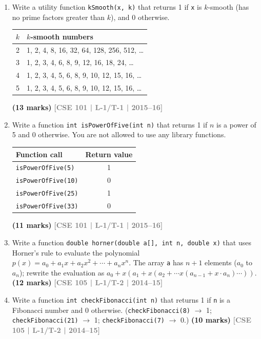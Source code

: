 \documentclass[12pt,a3paper]{article}
\newcommand{\yr}[1]{\hfill\textcolor{gray}{\small\textbf{[#1]}}}
\newcommand{\mk}[1]{\textcolor{orange!70!black}{\small\textbf{(#1 marks)}}}
\begin{document}
\begin{enumerate}
\item Write a utility function \texttt{kSmooth(x, k)} that returns 1 if \texttt{x} is $k$-smooth (has no prime factors greater than $k$), and 0 otherwise.
\begin{center}
\begin{tabular}{|c|l|}
\hline
$k$ & $k$-smooth numbers \\
\hline
2 & 1, 2, 4, 8, 16, 32, 64, 128, 256, 512, \ldots \\
3 & 1, 2, 3, 4, 6, 8, 9, 12, 16, 18, 24, \ldots \\
4 & 1, 2, 3, 4, 5, 6, 8, 9, 10, 12, 15, 16, \ldots \\
5 & 1, 2, 3, 4, 5, 6, 8, 9, 10, 12, 15, 16, \ldots \\
\hline
\end{tabular}
\end{center}
\mk{13} \yr{CSE 101 | L-1/T-1 | 2015--16}

\item Write a function \texttt{int isPowerOfFive(int n)} that returns 1 if $n$ is a power of 5 and 0 otherwise. You are not allowed to use any library functions.
\begin{center}
\begin{tabular}{|l|c|}
\hline
\textbf{Function call} & \textbf{Return value} \\
\hline
\texttt{isPowerOfFive(5)}  & 1 \\
\texttt{isPowerOfFive(10)} & 0 \\
\texttt{isPowerOfFive(25)} & 1 \\
\texttt{isPowerOfFive(33)} & 0 \\
\hline
\end{tabular}
\end{center}
\mk{11} \yr{CSE 101 | L-1/T-1 | 2015--16}

\item Write a function \texttt{double horner(double a[], int n, double x)} that uses Horner's rule to evaluate the polynomial $p(x) = a_0 + a_1 x + a_2 x^2 + \cdots + a_n x^n$. The array \texttt{a} has $n+1$ elements ($a_0$ to $a_n$); rewrite the evaluation as $a_0 + x(a_1 + x(a_2 + \cdots x(a_{n-1} + x \cdot a_n)\cdots))$.
\mk{12} \yr{CSE 105 | L-1/T-2 | 2014--15}

\item Write a function \texttt{int checkFibonacci(int n)} that returns 1 if \texttt{n} is a Fibonacci number and 0 otherwise. (\texttt{checkFibonacci(8)} $\to$ 1; \texttt{checkFibonacci(21)} $\to$ 1; \texttt{checkFibonacci(7)} $\to$ 0.)
\mk{10} \yr{CSE 105 | L-1/T-2 | 2014--15}


\end{enumerate}
\end{document}
